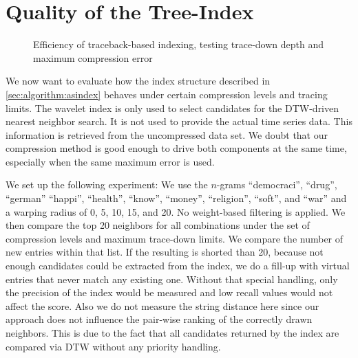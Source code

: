 \section{Quality of the Tree-Index}
\label{sec:evaluation:tb}

\begin{figure}
    \centering
    
    \caption{Efficiency of traceback-based indexing, testing trace-down depth and maximum compression error}\label{fig:tbindex}
\end{figure}

We now want to evaluate how the index structure described in \autoref{sec:algorithm:asindex} behaves under certain compression levels and tracing limits. The wavelet index is only used to select candidates for the DTW-driven nearest neighbor search. It is not used to provide the actual time series data. This information is retrieved from the uncompressed data set. We doubt that our compression method is good enough to drive both components at the same time, especially when the same maximum error is used.

We set up the following experiment: We use the $n$-grams \enquote{democraci}, \enquote{drug}, \enquote{german} \enquote{happi}, \enquote{health}, \enquote{know}, \enquote{money}, \enquote{religion}, \enquote{soft}, and \enquote{war} and a warping radius of \num{0}, \num{5}, \num{10}, \num{15}, and \num{20}. No weight-based filtering is applied. We then compare the top \num{20} neighbors for all combinations under the set of compression levels and maximum trace-down limits. We compare the number of new entries within that list. If the resulting is shorted than \num{20}, because not enough candidates could be extracted from the index, we do a fill-up with virtual entries that never match any existing one. Without that special handling, only the precision of the index would be measured and low recall values would not affect the score. Also we do not measure the string distance here since our approach does not influence the pair-wise ranking of the correctly drawn neighbors. This is due to the fact that all candidates returned by the index are compared via DTW without any priority handling.

